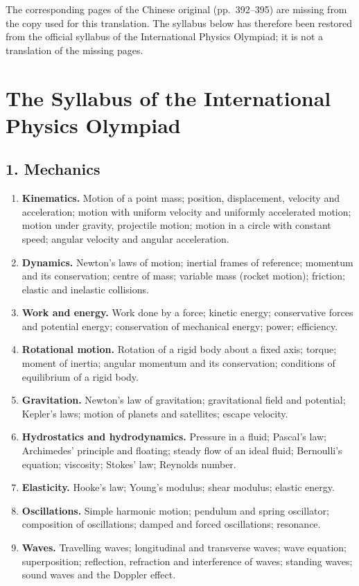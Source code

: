 \begin{note}
The corresponding pages of the Chinese original (pp.~392--395) are missing from the
copy used for this translation. The syllabus below has therefore been restored from the
official syllabus of the International Physics Olympiad; it is not a translation of the
missing pages.
\end{note}

\section{The Syllabus of the International Physics Olympiad}

\subsection*{1. Mechanics}

\begin{enumerate}[label=\arabic*.,leftmargin=2.2em,itemsep=1pt,topsep=2pt]
\item \textbf{Kinematics.} Motion of a point mass; position, displacement, velocity and acceleration;
motion with uniform velocity and uniformly accelerated motion; motion under gravity, projectile
motion; motion in a circle with constant speed; angular velocity and angular acceleration.
\item \textbf{Dynamics.} Newton's laws of motion; inertial frames of reference; momentum and its
conservation; centre of mass; variable mass (rocket motion); friction; elastic and inelastic
collisions.
\item \textbf{Work and energy.} Work done by a force; kinetic energy; conservative forces and
potential energy; conservation of mechanical energy; power; efficiency.
\item \textbf{Rotational motion.} Rotation of a rigid body about a fixed axis; torque; moment of
inertia; angular momentum and its conservation; conditions of equilibrium of a rigid body.
\item \textbf{Gravitation.} Newton's law of gravitation; gravitational field and potential; Kepler's
laws; motion of planets and satellites; escape velocity.
\item \textbf{Hydrostatics and hydrodynamics.} Pressure in a fluid; Pascal's law; Archimedes'
principle and floating; steady flow of an ideal fluid; Bernoulli's equation; viscosity; Stokes'
law; Reynolds number.
\item \textbf{Elasticity.} Hooke's law; Young's modulus; shear modulus; elastic energy.
\item \textbf{Oscillations.} Simple harmonic motion; pendulum and spring oscillator; composition of
oscillations; damped and forced oscillations; resonance.
\item \textbf{Waves.} Travelling waves; longitudinal and transverse waves; wave equation;
superposition; reflection, refraction and interference of waves; standing waves; sound waves and
the Doppler effect.
\end{enumerate}

